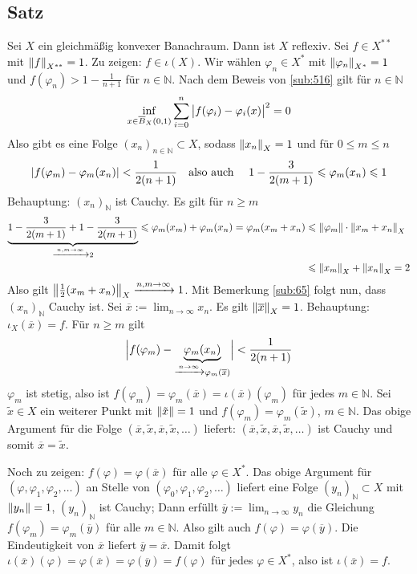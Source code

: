 \subsection[Satz: Gleichmäßig konvexe Banachräume sind reflexiv]{Satz} %
\label{sub:69}
Sei $X$ ein gleichmäßig konvexer Banachraum. Dann ist $X$ reflexiv.
Sei $f \in X^{**}$ mit $\norm[X^{**}]{f}=1$. Zu zeigen: $f \in \iota(X)$. Wir wählen $\varphi_n \in X^*$ mit $\norm[X^*]{\varphi_n}=1$ und $f(\varphi_n) > 1- \frac{1}{n+1}$
für $n \in \mathds{N}$. Nach dem Beweis von \ref{sub:516} gilt für $n \in \mathds{N}$
\[
	\inf_{x \in \overline{B}_X(0,1) } \sum_{i=0}^{n} \,\abs[\big]{f(\varphi_i) - \varphi_i(x)}^2 =0
\]
Also gibt es eine Folge $(x_n)_{n \in \mathds{N}} \subset X$, sodass $\norm[X]{x_n}=1$ und für $0 \le m \le n$
\[
	\abs*{f(\varphi_m)- \varphi_m(x_n)} < \frac{1}{2(n+1)} \quad \text{also auch } \quad 1- \frac{3}{2(m+1)}\le \varphi_m(x_n) \le 1
\]
Behauptung: $(x_n)_\mathds{N}$ ist Cauchy. Es gilt für $n \ge m$
\begin{align*}
	\underbrace{1- \frac{3}{2(m+1)}  + 1 - \frac{3}{2(m+1)}}_{\xrightarrow{n,m \to \infty} 2} \le \varphi_m(x_m) + \varphi_m(x_n) = \varphi_m(x_m+x_n) &\le \norm{\varphi_m} \cdot \norm[X]{x_m+x_n} \\
	&\le \norm[X]{x_m} + \norm[X]{x_n} = 2  
\end{align*}
Also gilt $ \norm[X]{\frac{1}{2} (x_m+x_n)} \xrightarrow{n,m \to \infty} 1$. Mit Bemerkung \ref{sub:65} folgt nun, dass $(x_n)_\mathds{N}$ Cauchy ist. Sei 
$\overline{x} := \lim_{ n \to \infty} x_n$. Es gilt $\norm[X]{\overline{x}}=1$. Behauptung: $\iota_X(\overline{x})=f$. Für $n \ge m$ gilt
\begin{align*}
	\abs[\Big]{f(\varphi_m) - \underbrace{\varphi_m(x_n)}_{\xrightarrow{n \to \infty} \varphi_m(\overline{x} )}} < \frac{1}{2(n+1)}  
\end{align*}
$\varphi_m$ ist stetig, also ist $f(\varphi_m)=\varphi_m(\overline{x})= \iota(\overline{x})(\varphi_m)$ für jedes $m \in\mathds{N}$. Sei $\tilde{x} \in X$ ein weiterer Punkt
mit $\norm{\tilde{x}}=1$ und $f(\varphi_m) = \varphi_m(\tilde{x})$, $m \in \mathds{N}$. Das obige Argument für die Folge 
$(\overline{x}, \tilde{x}, \overline{x}, \tilde{x}, \ldots)$ liefert: $(\overline{x}, \tilde{x}, \overline{x}, \tilde{x}, \ldots)$ ist Cauchy und somit
$\overline{x}=\tilde{x}$.

Noch zu zeigen: $f(\varphi)= \varphi(\overline{x})$ für alle $\varphi \in X^*$. Das obige Argument für $(\varphi, \varphi_1, \varphi_2, \ldots )$ an Stelle von
$(\varphi_0, \varphi_1, \varphi_2,\ldots )$ liefert eine Folge $(y_n)_\mathds{N} \subset X$ mit $\norm{y_n}=1$, $(y_n)_\mathds{N}$ ist Cauchy; 
Dann erfüllt $\overline{y} := \lim_{ n \to \infty} y_n$ die Gleichung $f(\varphi_m)=\varphi_m(\overline{y})$ für alle $m \in \mathds{N}$. Also gilt auch 
$f(\varphi)=\varphi(\overline{y})$. Die Eindeutigkeit von $\overline{x}$ liefert $ \overline{y}=\overline{x}$. Damit folgt 
$\iota(\overline{x})(\varphi)= \varphi(\overline{x})= \varphi(\overline{y})= f(\varphi)$ für jedes $\varphi \in X^*$, also ist $\iota(\overline{x})=f$. \bewende

